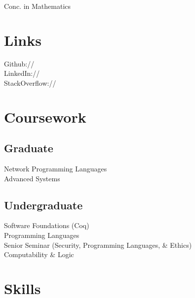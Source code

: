 \documentclass[]{deedy-resume-openfont}
\begin{document}
\begin{minipage}[t]{0.33\textwidth}


  Conc. in Mathematics
  \sectionsep





\section{Links} 
Github:// \href{https://github.com/ericthewry}{} \\
LinkedIn://  \href{https://www.linkedin.com/in/eric-campbell-ba339490/}{} \\
StackOverflow:// \href{https://stackoverflow.com/users/8202530/ericthewry}{}
\sectionsep


\section{Coursework}
\subsection{Graduate}
Network Programming Languages \\
Advanced Systems
\sectionsep

\subsection{Undergraduate}
Software Foundations (Coq) \\
Programming Languages \\
Senior Seminar (Security, Programming Languages, \& Ethics) \\
Computability \& Logic %
\sectionsep


\section{Skills}

\end{minipage}
\end{document}

